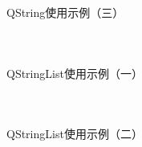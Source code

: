 \documentclass[UTF8,aspectratio=169]{beamer}
\begin{document}
\begin{frame}[fragile]{QString使用示例（三）}
    \begin{columns}
        \begin{column}{0.48\textwidth}
            \inputminted[firstline=72,lastline=85]{cpp}{code/qt_string_example.cpp}
        \end{column}
        \begin{column}{0.48\textwidth}
            \inputminted[firstline=87,lastline=101]{cpp}{code/qt_string_example.cpp}
        \end{column}
    \end{columns}
\end{frame}

\begin{frame}[fragile]{QStringList使用示例（一）}
    \begin{columns}
        \begin{column}{0.48\textwidth}
            \inputminted[firstline=1,lastline=17]{cpp}{code/qt_string_list_example.cpp}
        \end{column}
        \begin{column}{0.48\textwidth}
            \inputminted[firstline=18,lastline=30]{cpp}{code/qt_string_list_example.cpp}
        \end{column}
    \end{columns}
\end{frame}

\begin{frame}[fragile]{QStringList使用示例（二）}

    \begin{columns}
        \begin{column}{0.48\textwidth}
            \inputminted[firstline=31,lastline=42]{cpp}{code/qt_string_list_example.cpp}
        \end{column}
        \begin{column}{0.48\textwidth}
            \inputminted[firstline=43,lastline=54]{cpp}{code/qt_string_list_example.cpp}
        \end{column}
    \end{columns}
\end{frame}
\end{document}

